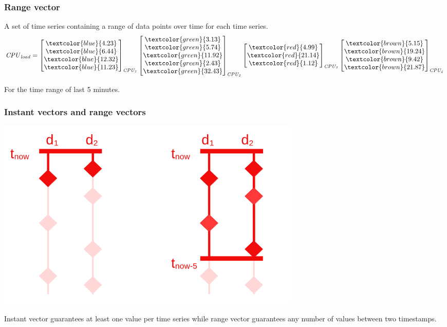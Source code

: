 \documentclass[xcolor=dvipsnames]{beamer}
\newcommand{\mli}[1]{\mathit{#1}}
\begin{document}
\begin{frame}
\frametitle{Range vector}
A set of time series containing a range of data points over time for each time series.
\[
\mli{CPU} _ \mli{load}=
\begin{bmatrix}
    \textcolor{blue}{4.23}      \\
    \textcolor{blue}{6.44}   \\
    \textcolor{blue}{12.32}   \\
    \textcolor{blue}{11.23}
\end{bmatrix}_\mli{CPU_1}
\begin{bmatrix}
    \textcolor{green}{3.13}      \\
    \textcolor{green}{5.74}   \\
    \textcolor{green}{11.92}   \\
    \textcolor{green}{2.43} \\
        \textcolor{green}{32.43} \\
\end{bmatrix}_\mli{CPU_2}
\begin{bmatrix}
    \textcolor{red}{4.99}      \\
    \textcolor{red}{21.14}   \\
    \textcolor{red}{1.12}   \\
\end{bmatrix}_\mli{CPU_3}
\begin{bmatrix}
    \textcolor{brown}{5.15}      \\
    \textcolor{brown}{19.24}   \\
    \textcolor{brown}{9.42}   \\
    \textcolor{brown}{21.87}
\end{bmatrix}_\mli{CPU_4}
\]

\footnotesize \centering For the time range of last 5 minutes.
\end{frame}

\begin{frame}
 \frametitle{Instant vectors and range vectors}
 \centering
\includegraphics[width=0.65\textwidth]{vect.png}

Instant vector guarantees at least one value per time series while range vector guarantees any number of values between two timestamps.
\end{frame}
\end{document}
